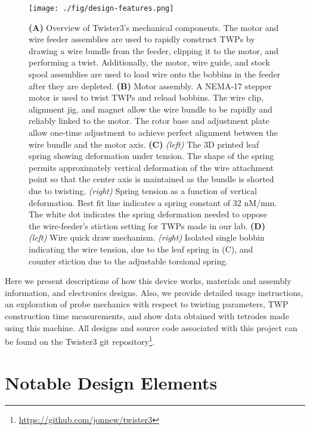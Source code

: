 \documentclass[11pt,a4paper]{article}
\begin{document}
\begin{figure}
\centering \texttt{[image: ./fig/design-features.png]}
\caption{\textbf{(A)} Overview of Twister3's mechanical components. The
    motor and wire feeder assemblies are used to rapidly construct TWPs by
    drawing a wire bundle from the feeder, clipping it to the motor, and
    performing a twist. Additionally, the motor, wire guide, and stock spool
    assemblies are used to load wire onto the bobbins in the feeder after they
    are depleted.
    \textbf{(B)} Motor assembly. A NEMA-17 stepper motor is used to twist TWPs
    and reload bobbins. The wire clip, alignment jig, and magnet allow the wire
    bundle to be rapidly and reliably linked to the motor. The rotor base and
    adjustment plate allow one-time adjustment to achieve perfect alignment
    between the wire bundle and the motor axis.
    \textbf{(C)} \textit{(left)} The 3D printed leaf spring showing deformation
    under tension. The shape of the spring permits approximately vertical
    deformation of the wire attachment point so that the center axis is
    maintained as the bundle is shorted due to twisting. \textit{(right)}
    Spring tension as a function of vertical deformation. Best fit line
    indicates a spring constant of 32 nM/mm. The white dot indicates the spring deformation
    needed to oppose the wire-feeder's stiction setting for TWPs made in our lab.
    \textbf{(D)} \textit{(left)} Wire quick draw mechanism. \textit{(right)} Isolated
    single bobbin indicating the wire tension, due to the leaf spring in (C),
    and counter stiction due to the adjustable torsional spring.}
\label{f:design-features}
\end{figure}


Here we present descriptions of how this device works, materials and assembly
information, and electronics designs. Also, we provide detailed usage
instructions, an exploration of probe mechanics with respect to twisting
parameters, TWP construction time measurements, and show data obtained with
tetrodes made using this machine. All designs and source code associated with
this project can be found on the Twister3 git
repository\footnote{\url{https://github.com/jonnew/twister3}}.

\section{Notable Design Elements}
\end{document}
